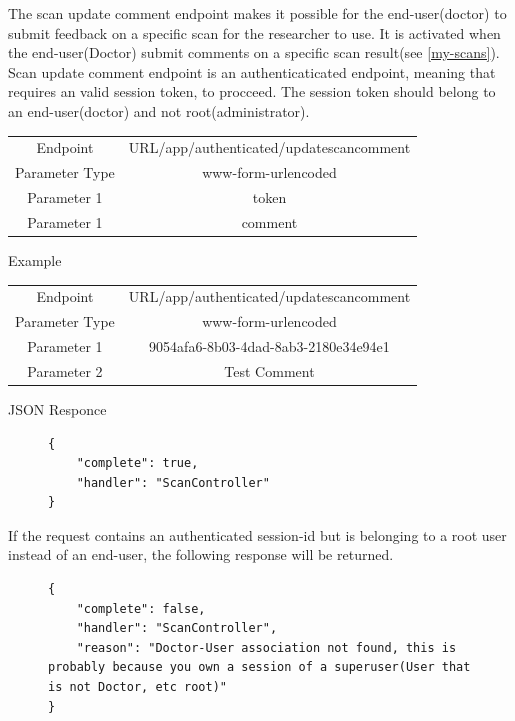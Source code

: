 					The scan update comment endpoint makes it possible for the end-user(doctor) to submit feedback on a specific scan for the researcher to use. 
					It is activated when the end-user(Doctor) submit comments on a specific scan result(see \ref{my-scans}). Scan update comment endpoint is an authenticaticated endpoint, 
					meaning that requires an valid session token, to procceed.  The session token should belong to an end-user(doctor) and not root(administrator).
					\begin{center}
						\begin{tabular}{ |c|c| } 
							\hline
							Endpoint & {{URL}}/app/authenticated/updatescancomment\\
							Parameter Type & www-form-urlencoded  \\
							Parameter 1 & token  \\
							Parameter 1 & comment  \\
							\hline
						\end{tabular}
					\end{center}
					Example
					\begin{center}
						\begin{tabular}{ |c|c| } 
							\hline
							Endpoint & {{URL}}/app/authenticated/updatescancomment\\
							Parameter Type & www-form-urlencoded  \\
							Parameter 1 & 9054afa6-8b03-4dad-8ab3-2180e34e94e1  \\
							Parameter 2 & Test Comment  \\
							\hline
						\end{tabular}
					\end{center}
					JSON Responce
					\begin{figure}[H]
						\iftrue
						\begin{lstlisting}[]
{
	"complete": true,
	"handler": "ScanController"
}
						\end{lstlisting}
					\end{figure}
					If the request contains an authenticated session-id but is belonging to a root user instead of an end-user, the following response will be returned.
					\begin{figure}[H]
						\iftrue
						\begin{lstlisting}[]
{	
	"complete": false,
	"handler": "ScanController",
	"reason": "Doctor-User association not found, this is probably because you own a session of a superuser(User that is not Doctor, etc root)"
}
						\end{lstlisting}
					\end{figure}
